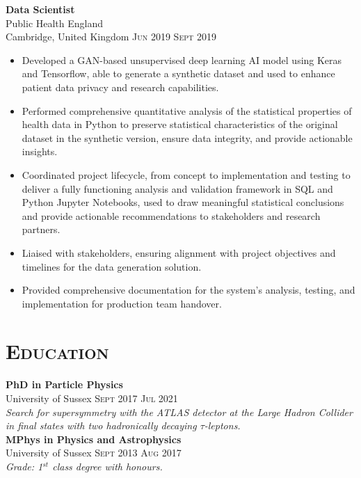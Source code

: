 \documentclass[oneside]{article}
\newcommand{\empitem}[7]{
        {\large \textbf{#1}} \\
        {{\fontseries{medium}\selectfont #2}}\\
        {{\fontseries{light}\selectfont #3}} \hfill
        {\scshape\fontseries{light}\selectfont\footnotesize #4 \textendash{} #5 #6} 
        #7
}
\begin{document}
{\begin{minipage}[t][\dimexpr\textheight-2\fboxrule-2\fboxsep\relax][t]{\dimexpr0.6\textwidth-2\fboxrule-2\fboxsep\relax}
        \empitem{Data Scientist}
        {Public Health England}
        {Cambridge, United Kingdom}
        {Jun 2019}
        {Sept 2019}
        {}
        {
        \begin{itemize}
            \setlength{\itemsep}{-3pt}
            \item Developed a GAN-based unsupervised deep learning AI model using Keras and Tensorflow, able to generate a synthetic dataset and used to enhance patient data privacy and research capabilities.
            \item Performed comprehensive quantitative analysis of the statistical properties of health data in Python to preserve statistical characteristics of the original dataset in the synthetic version, ensure data integrity, and provide actionable insights.
            \item Coordinated project lifecycle, from concept to implementation and testing to deliver a fully functioning analysis and validation framework in SQL and Python Jupyter Notebooks, used to draw meaningful statistical conclusions and provide actionable recommendations to stakeholders and research partners.
            \item Liaised with stakeholders, ensuring alignment with project objectives and timelines for the data generation solution.
            \item Provided comprehensive documentation for the system’s analysis, testing, and implementation for production team handover.
        \end{itemize}
        }
        
        \section*{\scshape\Large Education \hrulefill}
%
        {\large \textbf{PhD in Particle Physics}} \\ {University of Sussex}\hfill
        {\scshape{}\selectfont\footnotesize Sept 2017 \textendash{} Jul 2021} \\
        {\textit{Search for supersymmetry with the ATLAS detector at the Large Hadron Collider in final states with two hadronically decaying $\tau$-leptons.}} \\
        
        {\large \textbf{MPhys in Physics and Astrophysics}} \\ {University of Sussex} \hfill
        {\scshape{}\selectfont\footnotesize Sept 2013 \textendash{} Aug 2017} \\
        {\textit{Grade: 1$^{st}$ class degree with honours.}} \\


\end{minipage}}
\end{document}
